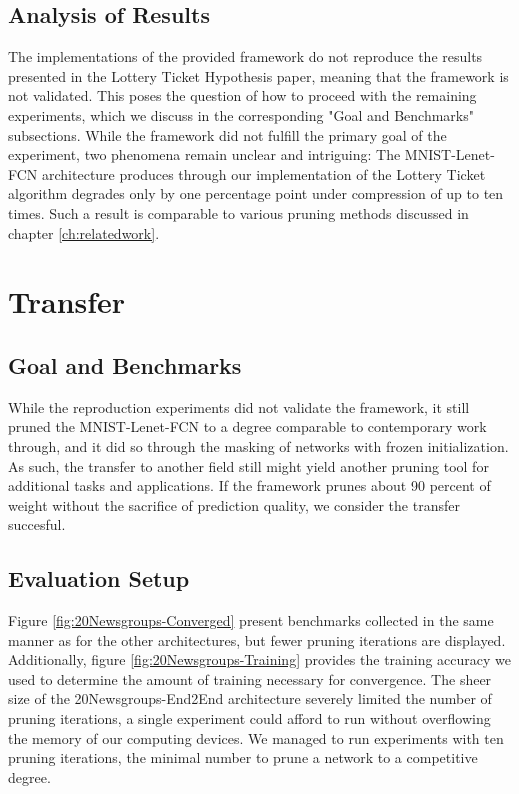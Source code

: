 \subsection*{Analysis of Results}
The implementations of the provided framework do not reproduce the results presented in the Lottery Ticket Hypothesis paper, meaning that the framework is not validated. This poses the question of how to proceed with the remaining experiments, which we discuss in the corresponding "Goal and Benchmarks" subsections.
While the framework did not fulfill the primary goal of the experiment, two phenomena remain unclear and intriguing:
The MNIST-Lenet-FCN architecture produces through our implementation of the Lottery Ticket algorithm degrades only by one percentage point under compression of up to ten times. Such a result is comparable to various pruning methods discussed in chapter \ref{ch:relatedwork}. 


\section{Transfer}
\subsection*{Goal and Benchmarks}
While the reproduction experiments did not validate the framework, it still pruned the MNIST-Lenet-FCN to a degree comparable to contemporary work through, and it did so through the masking of networks with frozen initialization. As such, the transfer to another field still might yield another pruning tool for additional tasks and applications. If the framework prunes about 90 percent of weight without the sacrifice of prediction quality, we consider the transfer succesful.
\subsection*{Evaluation Setup}
Figure \ref{fig:20Newsgroups-Converged} present benchmarks collected in the same manner as for the other architectures, but fewer pruning iterations are displayed. Additionally, figure \ref{fig:20Newsgroups-Training} provides the training accuracy we used to determine the amount of training necessary for convergence. The sheer size of the 20Newsgroups-End2End architecture severely limited the number of pruning iterations, a single experiment could afford to run without overflowing the memory of our computing devices. We managed to run experiments with ten pruning iterations, the minimal number to prune a network to a competitive degree. 
